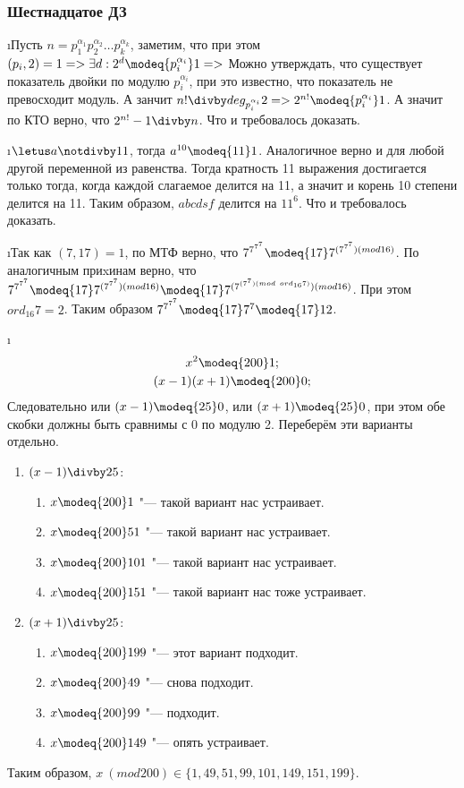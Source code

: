 \subsubsection{Шестнадцатое ДЗ}


\i Пусть $n = p_1^{\alpha_1}p_2^{\alpha_2}\ldots p_k^{\alpha_k}$, заметим, что при этом $(p_i, 2) = 1 => \exists d: 2^d \modeq{p_i^{\alpha_i}} 1 =>$ Можно утверждать, что существует показатель двойки по модулю $p_i^{\alpha_i}$, при это известно, что показатель не превосходит модуль. А занчит $n! \divby deg_{p_i^{\alpha_i}}2 => 2^{n!} \modeq{p_i^{\alpha_i}} 1$. А значит по КТО верно, что $2^{n!} -1 \divby n$. Что и требовалось доказать.

\i $\letus a \notdivby 11$, тогда $a^{10} \modeq{11} 1$. Аналогичное верно и для любой другой переменной из равенства. Тогда кратность 11 выражения достигается только тогда, когда каждой слагаемое делится на 11, а значит и корень 10 степени делится на 11. Таким образом, $abcdsf$ делится на $11^6$. Что и требовалось доказать.

\i Так как $(7, 17) = 1$, по МТФ верно, что $7^{7^{7^7}} \modeq{17} 7^{(7^{7^{7}})(mod 16)}$. По аналогичным приxинам верно, что $7^{7^{7^7}} \modeq{17} 7^{(7^{7^{7}})(mod 16)} \modeq{17} 7^{(7^{(7^7)(mod\ ord_{16}7)})(mod 16)}$. При этом $ord_{16} 7 = 2$. Таким образом $7^{7^{7^7}} \modeq{17} 7^7 \modeq{17} 12$.

\i
\begin{gather*}
    x^2 \modeq{200} 1;\\
    (x-1)(x+1) \modeq{200} 0;
\end{gather*}
Следовательно или $(x-1) \modeq{25} 0$, или $(x+1) \modeq{25} 0$, при этом обе скобки должны быть сравнимы с 0 по модулю 2. Переберём эти варианты отдельно.
\begin{enumerate}
    \item $(x-1) \divby 25$:
    \begin{enumerate}
        \item $x \modeq{200} 1$ "--- такой вариант нас устраивает.
        \item $x \modeq{200} 51$ "--- такой вариант нас устраивает.
        \item $x \modeq{200} 101$ "--- такой вариант нас устраивает.
        \item $x \modeq{200} 151$ "--- такой вариант нас тоже устраивает.
    \end{enumerate}
    \item $(x+1) \divby 25$:
    \begin{enumerate}
        \item $x \modeq{200} 199$ "--- этот вариант подходит.
        \item $x \modeq{200} 49$ "--- снова подходит.
        \item $x \modeq{200} 99$ "--- подходит.
        \item $x \modeq{200} 149$ "--- опять устраивает.
    \end{enumerate}
\end{enumerate}
Таким образом, $x\ (mod 200) \in \{1, 49, 51, 99, 101, 149, 151, 199\}$.

